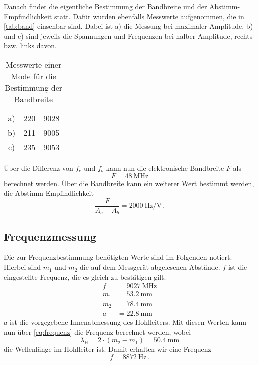 Danach findet die eigentliche Bestimmung der Bandbreite und der Abstimm-Empfindlichkeit statt.
Dafür wurden ebenfalls Messwerte aufgenommen, die in \autoref{tab:band} einsehbar sind.
Dabei ist a) die Messung bei maximaler Amplitude.
b) und c) sind jeweils die Spannungen und Frequenzen bei halber Amplitude, rechts bzw. links davon.

\begin{table}
    \centering
    \caption{Messwerte einer Mode für die Bestimmung der Bandbreite}
    \label{tab:band}
    \begin{tabular}{c S[table-format=3.0] S[table-format=4.0]}
        \toprule
         &  &  \\
        \midrule
        a) & 220 & 9028 \\
        b) & 211 & 9005 \\
        c) & 235 & 9053 \\
        \bottomrule
    \end{tabular}
\end{table}

Über die Differenz von $f_c$ und $f_b$ kann nun die elektronische Bandbreite $F$ als 
\begin{equation*}
    F = \SI{48}{\mega\hertz}
\end{equation*}
berechnet werden.
Über die Bandbreite kann ein weiterer Wert bestimmt werden, die Abstimm-Empfindlichkeit
\begin{equation*}
    \frac{F}{A_c - A_b} = \SI{2000}{\hertz\per\volt} \, .
\end{equation*}

\subsection{Frequenzmessung}
\label{ssec:a2}

Die zur Frequenzbestimmung benötigten Werte sind im Folgenden notiert.
Hierbei sind $m_1$ und $m_2$ die auf dem Messgerät abgelesenen Abstände.
$f$ ist die eingestellte Frequenz, die es gleich zu bestätigen gilt.
\begin{align*}
    f &= \SI{9027}{\mega\hertz} \\
    m_1 &= \SI{53.2}{\milli\meter} \\
    m_2 &= \SI{78.4}{\milli\meter} \\
    a &= \SI{22.8}{\milli\meter}
\end{align*}
$a$ ist die vorgegebene Innenabmessung des Hohlleiters.
Mit diesen Werten kann nun über \autoref{eq:frequenz} die Frequenz berechnet werden, wobei 
\begin{equation}
    \lambda _\text{H} = 2 \cdot (m_2 - m_1)= \SI{50.4}{\milli\meter}
    \label{eq:welle}
\end{equation}
die Wellenlänge im Hohlleiter ist.
Damit erhalten wir eine Frequenz
\begin{equation*}
    f = \SI{8872}{\hertz} \, .
\end{equation*}

